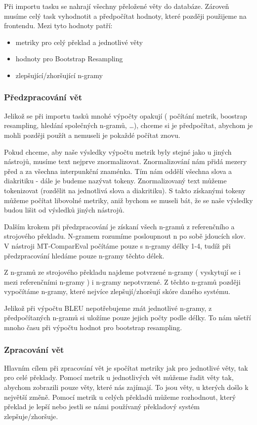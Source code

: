 Při importu tasku se nahrají všechny přeložené věty do databáze.
Zároveň musíme celý task vyhodnotit a předpočítat hodnoty,
  které později použijeme na frontendu.
Mezi tyto hodnoty patří:
\begin{itemize}
	\item metriky pro celý překlad a jednotlivé věty
	\item hodnoty pro Bootstrap Resampling 
	\item zlepšující/zhoršující n-gramy
\end{itemize}

\subsubsection{Předzpracování vět}
Jelikož se při importu tasků mnohé výpočty opakují
  ( počítání metrik, boostrap resampling, hledání společných n-gramů, \dots ),
  chceme si je předpočítat,
  abychom je mohli později použít a nemuseli je pokaždé počítat znovu.

Pokud chceme,
  aby naše výsledky výpočtu metrik byly stejné jako u jiných nástrojů,
  musíme text nejprve znormalizovat.
Znormalizování nám přidá mezery před a za všechna interpunkční znaménka.
Tím nám oddělí všechna slova a diakritiku - dále je budeme nazývat tokeny.
Znormalizovaný text můžeme tokenizovat (rozdělit na jednotlivá slova a diakritiku).
S takto získanými tokeny můžeme počítat libovolné metriky,
  aniž bychom se museli bát,
  že se naše výsledky budou lišit od výsledků jiných nástrojů.

Dalším krokem při předzpracování je získaní všech n-gramů z referenčního a strojového překladu.
N-gramem rozumíme posloupnout n po sobě jdoucích slov.
V nástroji MT-ComparEval počítáme pouze s n-gramy délky 1-4,
  tudíž při předzpracování hledáme pouze n-gramy těchto délek. 

Z n-gramů ze strojového překladu najdeme potvrzené n-gramy
  ( vyskytují se i mezi referenčními n-gramy )
  i n-gramy nepotvrzené.
Z těchto n-gramů později vypočítáme n-gramy,
  které nejvíce zlepšují/zhoršují skóre daného systému.
  
Jelikož při výpočtu BLEU nepotřebujeme znát jednotlivé n-gramy,
  z předpočítaných n-gramů si uložíme pouze jejich počty podle délky.
To nám ušetří mnoho času při výpočtu hodnot pro bootstrap resampling.

\subsubsection{Zpracování vět}
Hlavním cílem při zpracování vět je spočítat metriky jak pro jednotlivé věty,
  tak pro celé překlady.
Pomocí metrik u jednotlivých vět můžeme řadit věty tak,
  abychom zobrazili pouze věty, 
  které nás zajímají.
To jsou věty, u kterých došlo k největší změně.
Pomocí metrik u celých překladů můžeme rozhodnout,
  který překlad je lepší
  nebo jestli se námi používaný překladový systém zlepšuje/zhoršuje.

